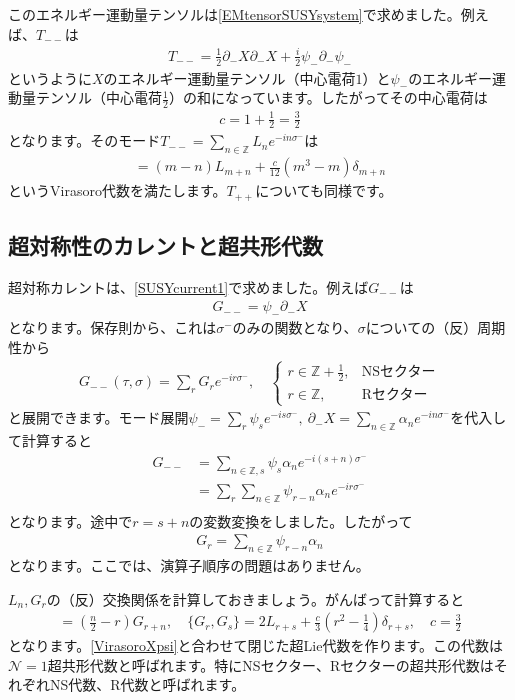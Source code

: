 \documentclass[report,paper=a4, fontsize=12pt, line_length=16cm, number_of_lines=34,dvipdfmx]{jlreq}
\numberwithin{equation}{chapter}
\numberwithin{equation}{section}
\newcommand{\Zb}{\mathbb{Z}}
\newcommand{\Ncal}{\mathcal{N}}
\newcommand{\del}{\partial}
\begin{document}
このエネルギー運動量テンソルは\eqref{EMtensorSUSYsystem}で求めました。例えば、$T_{--}$は
\begin{align}
  T_{--}=\frac12\del_{-}X\del_{-}X+\frac{i}{2}\psi_{-}\del_{-}\psi_{-}
\end{align}
というように$X$のエネルギー運動量テンソル（中心電荷$1$）と$\psi_{-}$のエネルギー運動量テンソル（中心電荷$\frac12$）の和になっています。したがってその中心電荷は
\begin{align}
  c=1+\frac12 =\frac{3}{2}
\end{align}
となります。そのモード$T_{--}=\sum_{n\in\Zb}L_{n}e^{-in\sigma^{-}}$は
\begin{align}
  [L_m,L_n]=(m-n)L_{m+n}+\frac{c}{12}(m^3-m)\delta_{m+n}\label{VirasoroXpsi}
\end{align}
というVirasoro代数を満たします。$T_{++}$についても同様です。

\subsection{超対称性のカレントと超共形代数}
超対称カレントは、\eqref{SUSYcurrent1}で求めました。例えば$G_{--}$は
\begin{align}
  G_{--}=\psi_{-}\del_{-}X
\end{align}
となります。保存則から、これは$\sigma^{-}$のみの関数となり、$\sigma$についての（反）周期性から
\begin{align}
  G_{--}(\tau,\sigma)=\sum_{r}G_{r}e^{-ir\sigma^{-}},\quad
  \begin{cases}
    r\in \Zb+\frac12,&\text{NSセクター}\\
    r\in \Zb,&\text{Rセクター}
  \end{cases}
\end{align}
と展開できます。モード展開$\psi_{-}=\sum_{r}\psi_{s}e^{-is\sigma^{-}},\ \del_{-}X=\sum_{n\in\Zb}\alpha_{n}e^{-in\sigma^{-}}$を代入して計算すると
\begin{align}
  G_{--}
  &=\sum_{n\in\Zb, s}\psi_{s}\alpha_{n}
  e^{-i(s+n)\sigma^{-}}\nonumber\\
  &=\sum_{r}\sum_{n\in\Zb}\psi_{r-n}\alpha_{n}
  e^{-ir\sigma^{-}}\nonumber\\
\end{align}
となります。途中で$r=s+n$の変数変換をしました。したがって
\begin{align}
  G_{r}=\sum_{n\in\Zb}\psi_{r-n}\alpha_{n}
\end{align}
となります。ここでは、演算子順序の問題はありません。

$L_n,G_r$の（反）交換関係を計算しておきましょう。がんばって計算すると
\begin{align}
  [L_n,G_r]=\left( \frac{n}{2} -r\right)G_{r+n},\quad
  \{G_r,G_s\}=2L_{r+s}+\frac{c}{3}\left( r^2-\frac{1}{4} \right)\delta_{r+s},\quad
  c=\frac{3}{2}
  \label{SCA}
\end{align}
となります。\eqref{VirasoroXpsi}と合わせて閉じた超Lie代数を作ります。この代数は$\Ncal=1$超共形代数と呼ばれます。特にNSセクター、Rセクターの超共形代数はそれぞれNS代数、R代数と呼ばれます。
\end{document}
